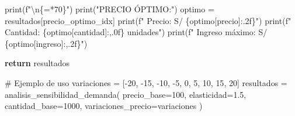 \documentclass[
  doc,
  floatsintext,
  longtable,
  a4paper,
  nolmodern,
  notxfonts,
  notimes,
  12pt,
  colorlinks=true,linkcolor=blue,citecolor=blue,urlcolor=blue]{apa7}
\newenvironment{Shaded}{\begin{snugshade}}{\end{snugshade}}
\newcommand{\BuiltInTok}[1]{\textcolor[rgb]{0.00,0.23,0.31}{#1}}
\newcommand{\CharTok}[1]{\textcolor[rgb]{0.13,0.47,0.30}{#1}}
\newcommand{\CommentTok}[1]{\textcolor[rgb]{0.37,0.37,0.37}{#1}}
\newcommand{\ControlFlowTok}[1]{\textcolor[rgb]{0.00,0.23,0.31}{\textbf{#1}}}
\newcommand{\DecValTok}[1]{\textcolor[rgb]{0.68,0.00,0.00}{#1}}
\newcommand{\FloatTok}[1]{\textcolor[rgb]{0.68,0.00,0.00}{#1}}
\newcommand{\NormalTok}[1]{\textcolor[rgb]{0.00,0.23,0.31}{#1}}
\newcommand{\OperatorTok}[1]{\textcolor[rgb]{0.37,0.37,0.37}{#1}}
\newcommand{\SpecialCharTok}[1]{\textcolor[rgb]{0.37,0.37,0.37}{#1}}
\newcommand{\SpecialStringTok}[1]{\textcolor[rgb]{0.13,0.47,0.30}{#1}}
\newcommand{\StringTok}[1]{\textcolor[rgb]{0.13,0.47,0.30}{#1}}
\begin{document}
\begin{Shaded}
\begin{Highlighting}[]
    \BuiltInTok{print}\NormalTok{(}\SpecialStringTok{f"}\CharTok{\textbackslash{}n}\SpecialCharTok{\{}\StringTok{\textquotesingle{}=\textquotesingle{}}\OperatorTok{*}\DecValTok{70}\SpecialCharTok{\}}\SpecialStringTok{"}\NormalTok{)}
    \BuiltInTok{print}\NormalTok{(}\StringTok{"PRECIO ÓPTIMO:"}\NormalTok{)}
\NormalTok{    optimo }\OperatorTok{=}\NormalTok{ resultados[precio\_optimo\_idx]}
    \BuiltInTok{print}\NormalTok{(}\SpecialStringTok{f"  Precio: S/ }\SpecialCharTok{\{}\NormalTok{optimo[}\StringTok{\textquotesingle{}precio\textquotesingle{}}\NormalTok{]}\SpecialCharTok{:.2f\}}\SpecialStringTok{"}\NormalTok{)}
    \BuiltInTok{print}\NormalTok{(}\SpecialStringTok{f"  Cantidad: }\SpecialCharTok{\{}\NormalTok{optimo[}\StringTok{\textquotesingle{}cantidad\textquotesingle{}}\NormalTok{]}\SpecialCharTok{:,.0f\}}\SpecialStringTok{ unidades"}\NormalTok{)}
    \BuiltInTok{print}\NormalTok{(}\SpecialStringTok{f"  Ingreso máximo: S/ }\SpecialCharTok{\{}\NormalTok{optimo[}\StringTok{\textquotesingle{}ingreso\textquotesingle{}}\NormalTok{]}\SpecialCharTok{:,.2f\}}\SpecialStringTok{"}\NormalTok{)}
    
    \ControlFlowTok{return}\NormalTok{ resultados}

\CommentTok{\# Ejemplo de uso}
\NormalTok{variaciones }\OperatorTok{=}\NormalTok{ [}\OperatorTok{{-}}\DecValTok{20}\NormalTok{, }\OperatorTok{{-}}\DecValTok{15}\NormalTok{, }\OperatorTok{{-}}\DecValTok{10}\NormalTok{, }\OperatorTok{{-}}\DecValTok{5}\NormalTok{, }\DecValTok{0}\NormalTok{, }\DecValTok{5}\NormalTok{, }\DecValTok{10}\NormalTok{, }\DecValTok{15}\NormalTok{, }\DecValTok{20}\NormalTok{]}
\NormalTok{resultados }\OperatorTok{=}\NormalTok{ analisis\_sensibilidad\_demanda(}
\NormalTok{    precio\_base}\OperatorTok{=}\DecValTok{100}\NormalTok{,}
\NormalTok{    elasticidad}\OperatorTok{=}\FloatTok{1.5}\NormalTok{,}
\NormalTok{    cantidad\_base}\OperatorTok{=}\DecValTok{1000}\NormalTok{,}
\NormalTok{    variaciones\_precio}\OperatorTok{=}\NormalTok{variaciones}
\NormalTok{)}
\end{Highlighting}
\end{Shaded}
\end{document}
